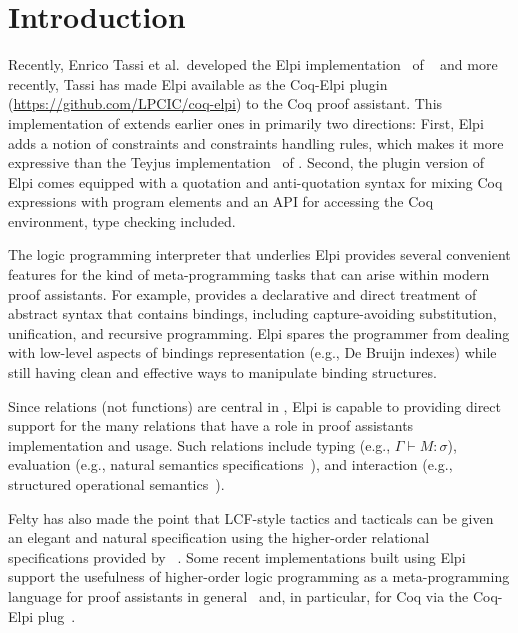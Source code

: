 \section{Introduction}
\label{sec:intro}

Recently, Enrico Tassi et al.\ developed the Elpi
implementation~\cite{dunchev15lpar} of \lP~\cite{miller12proghol} and
more recently, Tassi has made Elpi available as the Coq-Elpi
plugin~\cite{tassi18coqpl} (\url{https://github.com/LPCIC/coq-elpi})
to the Coq proof assistant.  This implementation of \lP extends
earlier ones in primarily two directions: First, Elpi adds a notion of
constraints and constraints handling rules, which makes it more
expressive than the Teyjus implementation~\cite{nadathur99cade} of
\lP. Second, the plugin version of Elpi comes equipped with a
quotation and anti-quotation syntax for mixing Coq expressions with
\lP program elements and an API for accessing the Coq environment,
type checking included.

The logic programming interpreter that underlies Elpi provides several
convenient features for the kind of meta-programming tasks that can
arise within modern proof assistants.  For example, \lP provides a
declarative and direct treatment of abstract syntax that contains
bindings, including capture-avoiding substitution,
unification, and recursive programming.  Elpi spares the
programmer from dealing with low-level aspects of bindings
representation (e.g., De Bruijn indexes) while still having clean and
effective ways to manipulate binding structures.

Since relations (not functions) are central in \lP, Elpi is capable to
providing direct support for the many relations that have a role in
proof assistants implementation and usage.  Such relations include
typing (e.g., $\Gamma\vdash M\colon\sigma$), evaluation (e.g., natural
semantics specifications~\cite{kahn87stacs,hannan93jfp}), and
interaction (e.g., structured operational semantics~\cite{milner89book,plotkin81}).

Felty has also made the point that LCF-style tactics and tacticals can
be given an elegant and natural specification using the higher-order
relational specifications provided by \lP~\cite{felty93jar}.  Some
recent implementations built using Elpi support the usefulness of
higher-order logic programming as a meta-programming language for
proof assistants in general~\cite{DunchevCT16,coen19mscs} and, in
particular, for Coq via the Coq-Elpi plug~\cite{CohenST20,tassi19itp}.

